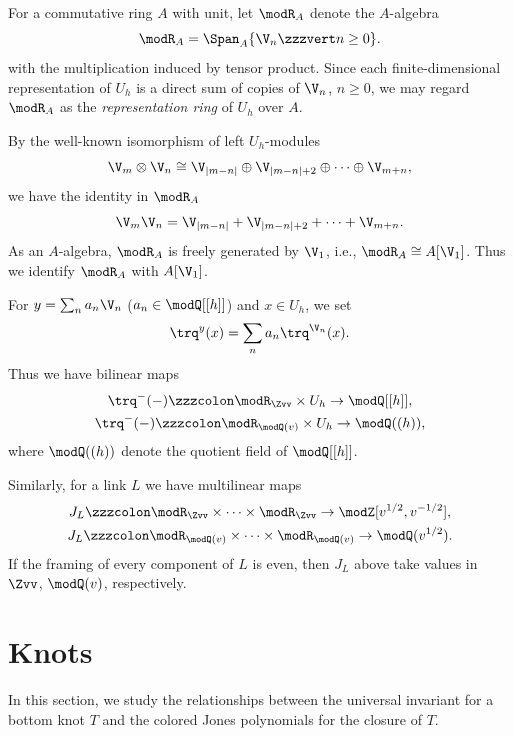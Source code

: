 \documentclass{amsart}
\numberwithin{equation}{section}
\numberwithin{figure}{section}
\theoremstyle{plain}
\theoremstyle{definition}
\theoremstyle{remark}
\begin{document}
For a commutative ring $A$ with unit, let $\modR _A$ denote the $A$-algebra
\begin{equation*}
  \modR _A = \Span_A\{\V_n\zzzvert n\ge 0\}.
\end{equation*}
with the multiplication induced by tensor product.  Since each
finite-dimensional representation of $U_h$ is a direct sum of copies
of $\V_n$, $n\ge 0$, we may regard $\modR _A$ as the {\em representation
ring} of $U_h$ over $A$.

By the well-known isomorphism of left $U_h$-modules
\begin{equation*}
  \V_m\otimes \V_n \cong
  \V_{|m-n|}\oplus\V_{|m-n|+2}\oplus\cdots\oplus\V_{m+n},
\end{equation*}
we have the identity in $\modR _A$
\begin{equation*}
  \V_m\V_n
  = \V_{|m-n|}+\V_{|m-n|+2}+\cdots+\V_{m+n}.
\end{equation*}
As an $A$-algebra, $\modR _A$ is freely generated by $\V_1$, i.e.,
$\modR _A\cong A[\V_1]$.
Thus we identify $\modR _A$ with $A[\V_1]$.

For $y=\sum_n a_n \V_n$ ($a_n\in \modQ [[h]]$) and $x\in U_h$, we set
\begin{equation*}
  \trq^{y}(x) = \sum_{n}a_n\trq^{\V_n}(x).
\end{equation*}
Thus we have bilinear maps
\begin{gather*}
  \trq^{-}(-)\zzzcolon \modR _{\Zvv}\times U_h\rightarrow \modQ [[h]],\\
  \trq^{-}(-)\zzzcolon \modR _{\modQ (v)}\times U_h\rightarrow \modQ ((h)),
\end{gather*}
where $\modQ ((h))$ denote the quotient field of $\modQ [[h]]$.

Similarly, for a link $L$ we have multilinear maps
\begin{gather*}
  J_L\zzzcolon \modR _{\Zvv}\times \cdots\times \modR _{\Zvv}\rightarrow  \modZ [v^{1/2},v^{-1/2}],\\
  J_L\zzzcolon \modR _{\modQ (v)}\times \cdots\times \modR _{\modQ (v)}\rightarrow  \modQ (v^{1/2}).
\end{gather*}
If the framing of every component of $L$ is even, then $J_L$ above
take values in $\Zvv$, $\modQ (v)$, respectively.

\section{Knots}
\label{sec6}

In this section, we study the relationships between the universal
invariant for a bottom knot $T$ and the colored Jones polynomials for
the closure of $T$.
\end{document}
